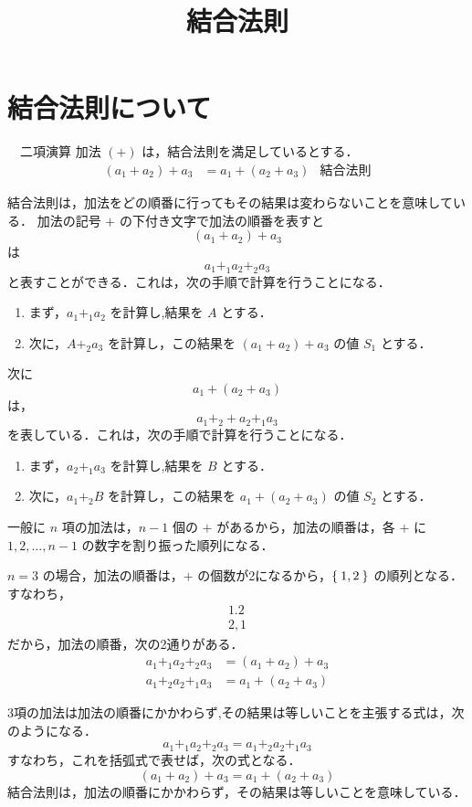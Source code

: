 \documentclass[leqno,autodetect-engine, dvipdfmx-if-dvi,ja=standard]{bxjsarticle}
\title{結合法則}
\begin{document}
	\section{結合法則について}

	\begin{dfn}　二項演算 加法 $(+)$ は，結合法則を満足しているとする．
		\begin{align}
			(a_1 + a_2) + a_3 &= a_1 + (a_2 + a_3)  & \text{結合法則}
		\end{align}
	\end{dfn}

	結合法則は，加法をどの順番に行ってもその結果は変わらないことを意味している．
	加法の記号 $+$ の下付き文字で加法の順番を表すと
	\[
	(a_1 + a_2) + a_3
	\]
	は
	\[
	a_1 +_1 a_2 +_2 a_3
	\]
	と表すことができる．これは，次の手順で計算を行うことになる．
	\begin{enumerate}
		\item まず，$a_1 +_1 a_2$ を計算し,結果を $A$ とする．
		\item 次に，$A +_2 a_3$ を計算し，この結果を $(a_1 + a_2) + a_3$ の値 $S_1$ とする．
	\end{enumerate}

	次に
	\[
	a_1 + (a_2 + a_3)
	\]
	は，
	\[
	a_1 +_2 + a_2 +_1 a_3
	\]
	を表している．これは，次の手順で計算を行うことになる．
	\begin{enumerate}
		\item まず，$a_2 +_1 a_3$ を計算し,結果を $B$ とする．
		\item 次に，$a_1 +_2 B$ を計算し，この結果を $a_1 + (a_2 + a_3)$ の値 $S_2$ とする．
	\end{enumerate}

	一般に $n$ 項の加法は，$n-1$ 個の $+$ があるから，加法の順番は，各 $+$ に $1,2,\dots,n-1$ の数字を割り振った順列になる．

	$n=3$ の場合，加法の順番は，$+$ の個数が2になるから，$\Set{1,2}$ の順列となる．すなわち，
	\begin{align}
	 1.2 \\
	 2,1
	\end{align}
	だから，加法の順番，次の2通りがある．
	\begin{align}
		a_1 +_1 a_2 +_2 a_3 &= (a_1 + a_2) + a_3 \\
		a_1 +_2 a_2 +_1 a_3 &= a_1 + (a_2 + a_3)
	\end{align}

	3項の加法は加法の順番にかかわらず,その結果は等しいことを主張する式は，次のようになる．
	\[
		a_1 +_1 a_2 +_2 a_3 = a_1 +_2 a_2 +_1 a_3
	\]
	すなわち，これを括弧式で表せば，次の式となる．
	\[
		(a_1 + a_2) + a_3 = a_1 + (a_2 + a_3)
	\]
	結合法則は，加法の順番にかかわらず，その結果は等しいことを意味している．
\end{document}
